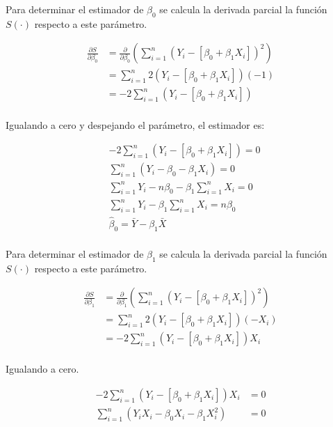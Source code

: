 \documentclass[
  11pt,
]{book}
\theoremstyle{definition}
\theoremstyle{definition}
\theoremstyle{definition}
\theoremstyle{definition}
\theoremstyle{remark}
\begin{document}
Para determinar el estimador de \(\beta_0\) se calcula la derivada parcial la función \(S(\cdot)\) respecto a este parámetro.

\begin{equation}
\begin{split}
\frac{\partial S}{\partial\beta_0} &= \frac{\partial }{\partial\beta_0}\left(\sum_{i=1}^n (Y_i - [\beta_0 + \beta_1X_i])^2\right)\\
&= \sum_{i=1}^n 2(Y_i - [\beta_0 + \beta_1X_i])(-1)\\
&= -2\sum_{i=1}^n (Y_i - [\beta_0 + \beta_1X_i])\\
\end{split}
\label{eq:beta0estimador-demostracion1}
\end{equation}

Igualando a cero y despejando el parámetro, el estimador es:

\begin{equation}
\begin{split}
&-2\sum_{i=1}^n (Y_i - [\beta_0 + \beta_1X_i]) = 0\\
&\sum_{i=1}^n (Y_i - \beta_0 - \beta_1X_i) = 0\\
&\sum_{i=1}^n Y_i - n\beta_0 - \beta_1\sum_{i=1}^nX_i = 0\\
&\sum_{i=1}^n Y_i - \beta_1\sum_{i=1}^nX_i = n\beta_0\\
&\widehat{\beta}_0 = \bar{Y} - \beta_1\bar{X} \\
\end{split}
\label{eq:beta0estimador-demostracion2}
\end{equation}

Para determinar el estimador de \(\beta_1\) se calcula la derivada parcial la función \(S(\cdot)\) respecto a este parámetro.

\begin{equation}
\begin{split}
\frac{\partial S}{\partial\beta_1} &= \frac{\partial }{\partial\beta_1}\left(\sum_{i=1}^n (Y_i - [\beta_0 + \beta_1X_i])^2\right)\\
&= \sum_{i=1}^n 2(Y_i - [\beta_0 + \beta_1X_i])(-X_i)\\
&= -2\sum_{i=1}^n (Y_i - [\beta_0 + \beta_1X_i])X_i\\
\end{split}
\label{eq:beta1estimador-demostracion1}
\end{equation}

Igualando a cero.

\begin{equation}
\begin{split}
-2\sum_{i=1}^n (Y_i - [\beta_0 + \beta_1X_i])X_i &= 0\\
\sum_{i=1}^n (Y_iX_i - \beta_0X_i - \beta_1X_i^2) &= 0\\
\end{split}
\label{eq:beta1estimador-demostracion2}
\end{equation}
\end{document}
